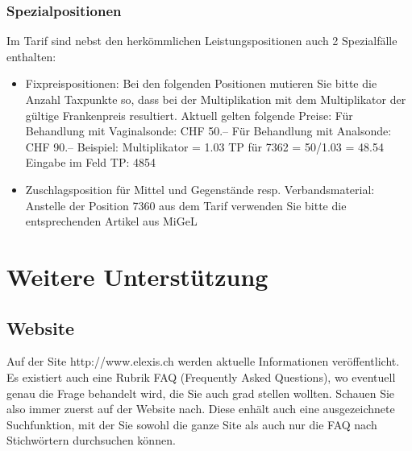 \documentclass[a4paper]{scrartcl}
\begin{document}
\subsubsection{Spezialpositionen}
Im Tarif sind nebst den herkömmlichen Leistungspositionen auch 2 Spezialfälle enthalten:
\begin{flushleft}
\begin{itemize}
\item
Fixpreispositionen:\linebreak
Bei den folgenden Positionen mutieren Sie bitte die Anzahl Taxpunkte so, dass bei der Multiplikation mit dem Multiplikator der gültige Frankenpreis resultiert. Aktuell gelten folgende Preise: Für Behandlung mit Vaginalsonde: CHF 50.-- Für Behandlung mit Analsonde: CHF 90.--\linebreak
Beispiel:\linebreak
Multiplikator = 1.03\linebreak
TP für 7362 = 50/1.03 = 48.54\linebreak
Eingabe im Feld TP: 4854
\item Zuschlagsposition für Mittel und Gegenstände resp. Verbandsmaterial:\linebreak
Anstelle der Position 7360 aus dem Tarif verwenden Sie bitte die entsprechenden Artikel aus MiGeL
\end{itemize}
\end{flushleft}

\section{Weitere Unterstützung}
\subsection{Website}
Auf der Site http://www.elexis.ch werden aktuelle Informationen veröffentlicht. Es existiert auch eine Rubrik FAQ (Frequently Asked Questions), wo eventuell genau die Frage behandelt wird, die Sie auch grad stellen wollten. Schauen Sie also immer zuerst auf der Website nach. Diese enhält auch eine ausgezeichnete Suchfunktion, mit der Sie sowohl die ganze Site als auch nur die FAQ nach Stichwörtern durchsuchen können.
\end{document}
